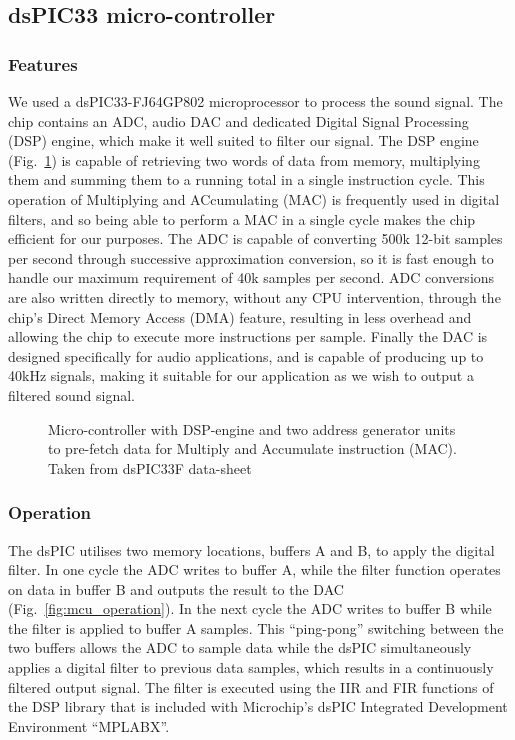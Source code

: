 \subsection{dsPIC33 micro-controller}
\subsubsection{Features}
We used a dsPIC33-FJ64GP802 microprocessor to process the sound signal. The chip contains an ADC, audio DAC and dedicated Digital Signal Processing (DSP) engine, which make it well suited to filter our signal. The DSP engine (Fig.~\ref{fig:dsp_block}) is capable of retrieving two words of data from memory, multiplying them and summing them to a running total in a single instruction cycle. This operation of Multiplying and ACcumulating (MAC) is frequently used in digital filters, and so being able to perform a MAC in a single cycle makes the chip efficient for our purposes. The ADC is capable of converting 500k 12-bit samples per second through successive approximation conversion, so it is fast enough to handle our maximum requirement of 40k samples per second. ADC conversions are also written directly to memory, without any CPU intervention, through the chip's Direct Memory Access (DMA) feature, resulting in less overhead and allowing the chip to execute more instructions per sample. Finally the DAC is designed specifically for audio applications, and is capable of producing up to 40kHz signals, making it suitable for our application as we wish to output a filtered sound signal. 

\begin{figure}[!ht]
	\centering
	\caption{Micro-controller with DSP-engine and two address generator units to pre-fetch data for Multiply and Accumulate instruction (MAC). Taken from dsPIC33F data-sheet \cite[p.~14]{dspic_datasheet}}
	\label{fig:dsp_block}
\end{figure}

\subsubsection{Operation}
The dsPIC utilises two memory locations, buffers A and B, to apply the digital filter. In one cycle the ADC writes to buffer A, while the filter function operates on data in buffer B and outputs the result to the DAC (Fig.~\ref{fig:mcu_operation}). In the next cycle the ADC writes to buffer B while the filter is applied to buffer A samples. This ``ping-pong'' switching between the two buffers allows the ADC to sample data while the dsPIC simultaneously applies a digital filter to previous data samples, which results in a continuously filtered output signal. The filter is executed using the IIR and FIR functions of the DSP library that is included with Microchip's dsPIC Integrated Development Environment ``MPLABX''.

